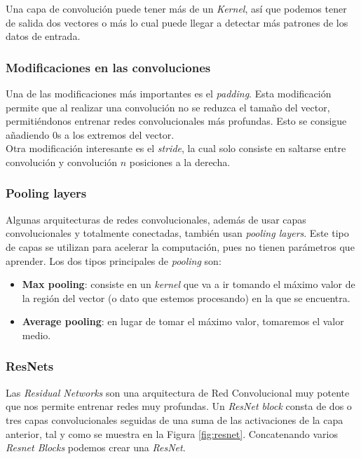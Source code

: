 Una capa de convolución puede tener más de un \textit{Kernel}, así que podemos tener de salida dos vectores o más lo cual puede llegar a detectar más patrones de los datos de entrada.

\subsubsection{Modificaciones en las convoluciones}

Una de las modificaciones más importantes es el \textit{padding}. Esta modificación permite que al realizar una convolución no se reduzca el tamaño del vector, permitiéndonos entrenar redes convolucionales más profundas. Esto se consigue añadiendo 0s a los extremos del vector.\\

Otra modificación interesante es el \textit{stride}, la cual solo consiste en saltarse entre convolución y convolución $n$ posiciones a la derecha.

\subsubsection{Pooling layers}

Algunas arquitecturas de redes convolucionales, además de usar capas convolucionales y totalmente conectadas, también usan \textit{pooling layers}. Este tipo de capas se utilizan para acelerar la computación, pues no tienen parámetros que aprender. Los dos tipos principales de \textit{pooling} son:

\begin{itemize}
	\item \textbf{Max pooling}: consiste en un \textit{kernel} que va a ir tomando el máximo valor de la región del vector (o dato que estemos procesando) en la que se encuentra.
	\item \textbf{Average pooling}: en lugar de tomar el máximo valor, tomaremos el valor medio.
\end{itemize}

\subsubsection{ResNets}

Las \textit{Residual Networks} son una arquitectura de Red Convolucional muy potente que nos permite entrenar redes muy profundas. Un \textit{ResNet block} consta de dos o tres capas convolucionales seguidas de una suma de las activaciones de la capa anterior, tal y como se muestra en la Figura \ref{fig:resnet}. Concatenando varios \textit{Resnet Blocks} podemos crear una \textit{ResNet}.

